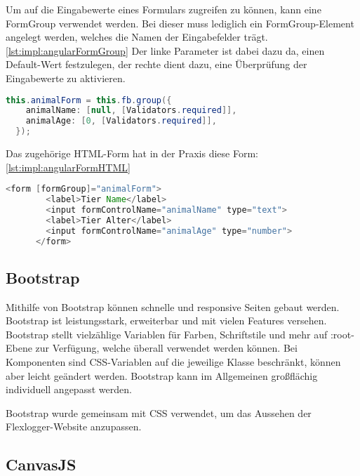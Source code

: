Um auf die Eingabewerte eines Formulars zugreifen zu können, kann eine FormGroup verwendet werden. Bei dieser muss lediglich ein FormGroup-Element angelegt werden, welches die Namen der Eingabefelder trägt. \ref{lst:impl:angularFormGroup} Der linke Parameter ist dabei dazu da, einen Default-Wert festzulegen, der rechte dient dazu, eine Überprüfung der Eingabewerte zu aktivieren.
 
\begin{lstlisting}[language=java,caption=Beispiel für FormGroup eines Angular Formulars,label=lst:impl:angularFormGroup]
  this.animalForm = this.fb.group({
    animalName: [null, [Validators.required]],
    animalAge: [0, [Validators.required]],
  });
\end{lstlisting}
 
Das zugehörige HTML-Form hat in der Praxis diese Form:  \ref{lst:impl:angularFormHTML}
 
 
\begin{lstlisting}[language=java,caption=Beispiel für ein reaktives Formular,label=lst:impl:angularFormHTML]
  <form [formGroup]="animalForm">
        <label>Tier Name</label>
        <input formControlName="animalName" type="text">
        <label>Tier Alter</label>
        <input formControlName="animalAge" type="number">
      </form>
\end{lstlisting}
\cite{angularHandbuchBuch}
 
 
\subsection{Bootstrap}
Mithilfe von Bootstrap können schnelle und responsive Seiten gebaut werden. Bootstrap ist leistungsstark, erweiterbar und mit vielen Features versehen. Bootstrap stellt vielzählige Variablen für Farben, Schriftstile und mehr auf :root-Ebene zur Verfügung, welche überall verwendet werden können. Bei Komponenten sind CSS-Variablen auf die jeweilige Klasse beschränkt, können aber leicht geändert werden. Bootstrap kann im Allgemeinen großflächig individuell angepasst werden.
\cite{bootstrap}

Bootstrap wurde gemeinsam mit CSS verwendet, um das Aussehen der Flexlogger-Website anzupassen.


\subsection{CanvasJS}
\label{subsection:canvasJS}
 
